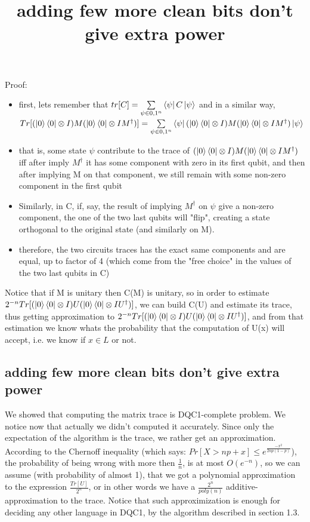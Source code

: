 \documentclass{article}
\begin{document}
Proof:
\begin{itemize}
\item first, lets remember that $tr[C] = \sum\limits_{\psi \in {0,1}^n} \Bra{\psi}C\Ket{\psi}$
and in a similar way, $Tr[(\Ket{0}\Bra{0}\otimes I)M(\Ket{0}\Bra{0}\otimes I{M^\dagger})] = \sum\limits_{\psi \in {0,1}^n} \Bra{\psi}(\Ket{0}\Bra{0}\otimes I)M(\Ket{0}\Bra{0}\otimes I{M^\dagger})\Ket{\psi}$
\end{itemize}

\begin{itemize}
\item that is, some state $\psi$ contribute to the trace of $(\Ket{0}\Bra{0}\otimes I)M(\Ket{0}\Bra{0}\otimes I{M^\dagger})$ iff after imply $M^\dagger$ it has some
component with zero in its first qubit, and then after implying M on that component, we still remain with some non-zero component in the first qubit
\item Similarly, in C, if, say, the result of implying $M^\dagger$ on $\psi$ give a non-zero component, the one of the two last qubits will "flip", creating a state orthogonal to the original state
(and similarly on M).
\item therefore, the two circuits traces has the exact same components and are equal, up to factor of 4
(which come from the "free choice" in the values of the two last qubits in C)
 
\end{itemize}

Notice that if M is unitary then C(M) is unitary, so in order to estimate $2^{-n}Tr[(\Ket{0}\Bra{0}\otimes I)U(\Ket{0}\Bra{0}\otimes I{U^\dagger})]$, we can build C(U) and
estimate its trace, thus getting approximation to  $2^{-n}Tr[(\Ket{0}\Bra{0}\otimes I)U(\Ket{0}\Bra{0}\otimes I{U^\dagger})]$, and from that estimation
we know whats the probability that the computation of U(x) will accept, i.e. we know if $x \in L$ or not.



\subsection{adding few more clean bits don't give extra power}
\title{adding few more clean bits don't give extra power}
We showed that computing the matrix trace is DQC1-complete problem.
We notice now that actually we didn't computed it accurately. Since only the expectation of the algorithm is the trace, we rather get an approximation. According to the Chernoff inequality (which says: \(Pr[X > np +x] \leq e^{\frac{-x^{2}}{2np(1-p)}}\)), the probability of being wrong with more then \(\frac{1}{n}\), is at most \(O(e^{-n})\), so we can assume (with probability of almost 1), that we got a polynomial approximation to the expression $\frac{Tr[U]}{2^{n}}$,  or  in other words we have a $\frac{2^{n}}{poly(n)}$ additive- approximation to the trace. Notice that such approximization is enough for deciding any other language in DQC1, by the algorithm described in section 1.3.
\end{document}
